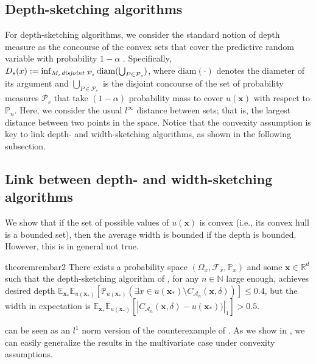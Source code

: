 \subsection{Depth-sketching algorithms}
For depth-sketching algorithms, we consider the standard notion of depth measure as the concourse of the convex sets that cover the predictive random variable with probability $1 - \alpha$ \citep[see, e.g.,][]{lei2018distributionfree,barber2021limits,bates2021distributionfree}. Specifically, $D_s(x):= \inf_{M_s \text{\normalfont{\emph{disjoint}} }  \mathcal{P}_s} \mathrm{diam}(\bigcup_{P \in  \mathcal{P}_s})$, where $\mathrm{diam}(\cdot)$ denotes the diameter of its argument and $\bigcup_{P \in  \mathcal{P}_s}$ is the disjoint concourse of the set of probability measures $\mathcal{P}_s$  that take $(1 - \alpha)$ probability mass to cover $u(\bm{x})$ with respect to $\mathbb{P}_n$. Here, we consider the usual $l^{\infty}$ distance between sets; that is, the largest distance between two points in the space. Notice that the convexity assumption is key to link depth- and width-sketching algorithms, as shown in the following subsection. 

\subsection{Link between depth- and width-sketching algorithms}
We show that if the set of possible values of $u(\bm{x})$ is convex (i.e., its convex hull is a bounded set), then the average width is bounded if the depth is bounded. However, this is in general not true.
\begin{restatable}{theorem}{rembar2}\label{prop:rem2}
There exists a probability space $(\Omega_x, \mathcal{F}_x,\mathbb{P}_x)$ and some $\bm{x} \in \mathbb{R}^d$ such that the depth-sketching algorithm of \cite{angelopoulos2024conformal}, for any $n \in \mathbb{N}$ large enough, achieves desired depth $\mathbb{E}_{\bm{x}_*} \mathbb{E}_{u(\bm{x_*})}[\mathbb{P}_{u(\bm{x_*})}(\exists x \in u(\bm{x_*}) \setminus C_{\mathcal{A}_n}(\bm{x},\delta))] \leq 0.4$, but the width in expectation is $\mathbb{E}_{\bm{x}_*} \mathbb{E}_{u(\bm{x_*})}[|C_{\mathcal{A}_n}(\bm{x},\delta) - u(\bm{x_*}))|_1] > 0.5$.
\end{restatable}
\begin{remark}
     can be seen as an $l^1$ norm version of the counterexample of \cite{angelopoulos2024conformal}. As we show in , we can easily generalize the results in the multivariate case under convexity assumptions.
\end{remark}

